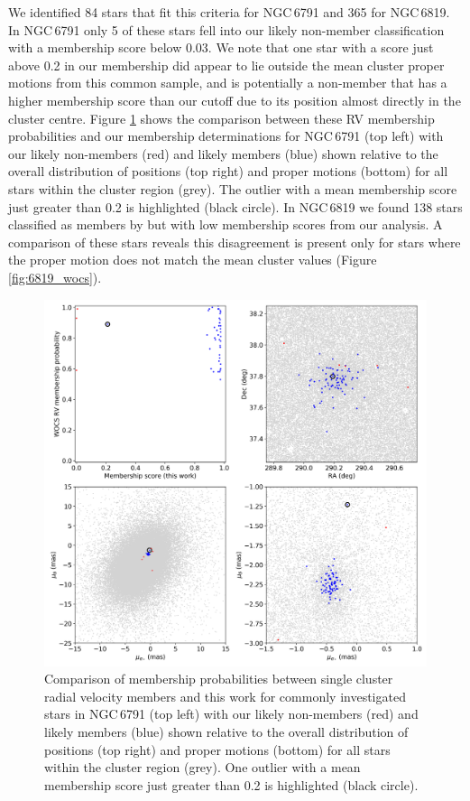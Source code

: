 We identified 84 stars that fit this criteria for NGC\,6791 and 365 for NGC\,6819. In NGC\,6791 only 5 of these stars fell into our likely non-member classification with a membership score below 0.03. We note that one star with a score just above 0.2 in our membership did appear to lie outside the mean cluster proper motions from this common sample, and is potentially a non-member that has a higher membership score than our cutoff due to its position almost directly in the cluster centre. Figure \ref{fig:6791_wocs} shows the comparison between these RV membership probabilities and our membership determinations for NGC\,6791 (top left) with our likely non-members (red) and likely members (blue) shown relative to the overall distribution of positions (top right) and proper motions (bottom) for all stars within the cluster region (grey). The outlier with a mean membership score just greater than 0.2 is highlighted (black circle). In NGC\,6819 we found 138 stars classified as members by \citet{hole_wiyn_2009} but with low membership scores from our analysis. A comparison of these stars reveals this disagreement is present only for stars where the proper motion does not match the mean cluster values (Figure \ref{fig:6819_wocs}). 

\begin{figure}[hbtp]
    \centering
    \includegraphics[width=0.98\linewidth]{Chapter4/wocs_com_6791.png}
    \caption[Comparison with WOCS RV members for NGC\,6791]{Comparison of membership probabilities between \cite{tofflemire_wiyn_2014} single cluster radial velocity members and this work for commonly investigated stars in NGC\,6791 (top left) with our likely non-members (red) and likely members (blue) shown relative to the overall distribution of positions (top right) and proper motions (bottom) for all stars within the cluster region (grey). One outlier with a mean membership score just greater than 0.2 is highlighted (black circle).}
    \label{fig:6791_wocs}
\end{figure}

